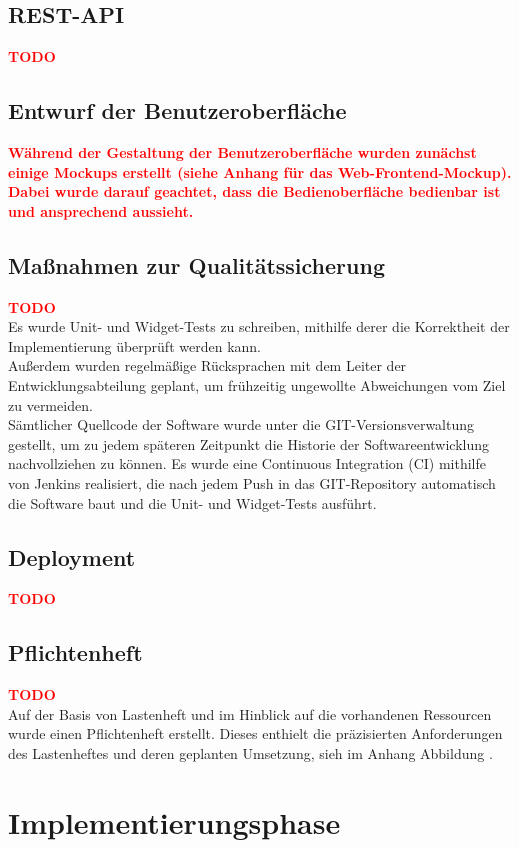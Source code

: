 \begin{flushleft}
\subsection{REST-API}
\textcolor{red}{\textbf{TODO}}\\
\subsection{Entwurf der Benutzeroberfläche}
\textcolor{red}{\textbf{Während der Gestaltung der Benutzeroberfläche wurden zunächst einige Mockups erstellt (siehe Anhang für das Web-Frontend-Mockup). Dabei wurde darauf geachtet, dass die Bedienoberfläche bedienbar ist und ansprechend aussieht.}}\\
\subsection{Maßnahmen zur Qualitätssicherung}
\textcolor{red}{\textbf{TODO}}\\
Es wurde Unit- und Widget-Tests zu schreiben, mithilfe derer die Korrektheit  der Implementierung überprüft werden kann.\\
Außerdem wurden regelmäßige Rücksprachen mit dem Leiter der Entwicklungsabteilung geplant, um frühzeitig ungewollte Abweichungen vom Ziel zu vermeiden.\\
Sämtlicher Quellcode der Software wurde unter die GIT-Versionsverwaltung gestellt, um zu jedem späteren Zeitpunkt die Historie der Softwareentwicklung nachvollziehen zu können.
Es wurde eine Continuous Integration (CI) mithilfe von Jenkins realisiert, die nach jedem Push in das GIT-Repository automatisch die Software baut und die Unit- und Widget-Tests ausführt.\\
\subsection{Deployment}
\textcolor{red}{\textbf{TODO}}\\
\subsection{Pflichtenheft}
\textcolor{red}{\textbf{TODO}}\\
Auf der Basis von Lastenheft und im Hinblick auf die vorhandenen Ressourcen wurde einen Pflichtenheft erstellt. Dieses enthielt die präzisierten Anforderungen des Lastenheftes und deren geplanten Umsetzung, sieh im Anhang Abbildung .\\
\section{Implementierungsphase}

\end{flushleft}
